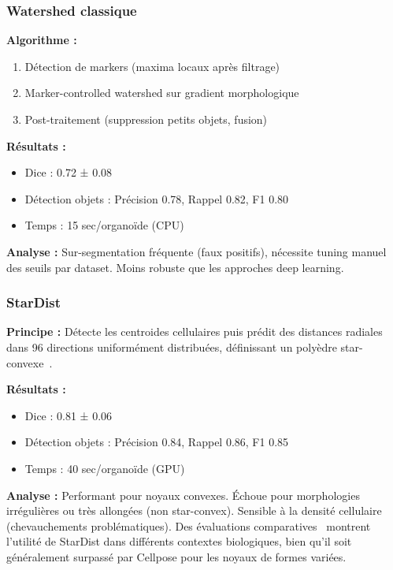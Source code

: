 \subsubsection{Watershed classique}

\textbf{Algorithme :}
\begin{enumerate}
    \item Détection de markers (maxima locaux après filtrage)
    \item Marker-controlled watershed sur gradient morphologique
    \item Post-traitement (suppression petits objets, fusion)
\end{enumerate}

\textbf{Résultats :}
\begin{itemize}
    \item Dice : 0.72 ± 0.08
    \item Détection objets : Précision 0.78, Rappel 0.82, F1 0.80
    \item Temps : 15 sec/organoïde (CPU)
\end{itemize}

\textbf{Analyse :}
Sur-segmentation fréquente (faux positifs), nécessite tuning manuel des seuils par dataset. Moins robuste que les approches deep learning.

\subsubsection{StarDist}

\textbf{Principe :}
Détecte les centroides cellulaires puis prédit des distances radiales dans 96 directions uniformément distribuées, définissant un polyèdre star-convexe~\cite{Schmidt2018}.

\textbf{Résultats :}
\begin{itemize}
    \item Dice : 0.81 ± 0.06
    \item Détection objets : Précision 0.84, Rappel 0.86, F1 0.85
    \item Temps : 40 sec/organoïde (GPU)
\end{itemize}

\textbf{Analyse :}
Performant pour noyaux convexes. Échoue pour morphologies irrégulières ou très allongées (non star-convex). Sensible à la densité cellulaire (chevauchements problématiques). Des évaluations comparatives~\cite{Weigert2022,Kleinberg2022} montrent l'utilité de StarDist dans différents contextes biologiques, bien qu'il soit généralement surpassé par Cellpose pour les noyaux de formes variées.

